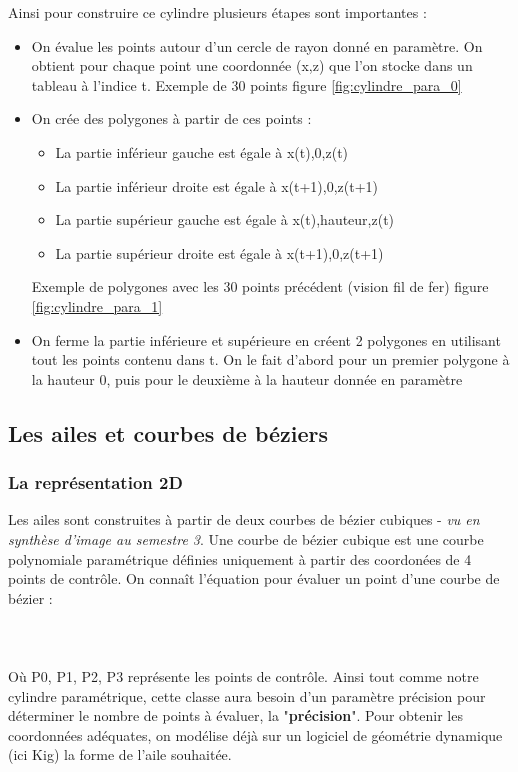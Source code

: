 \documentclass{article}
\begin{document}
Ainsi pour construire ce cylindre plusieurs étapes sont importantes :

\begin{itemize}
\item On évalue les points autour d'un cercle de rayon donné en paramètre. On obtient pour chaque point une coordonnée (x,z) que l'on stocke dans un tableau à l'indice t. Exemple de 30 points figure \ref{fig:cylindre_para_0}
\item On crée des polygones à partir de ces points :
	\begin{itemize}
		\item La partie inférieur gauche est égale à x(t),0,z(t)
		\item La partie inférieur droite est égale à x(t+1),0,z(t+1)
		\item La partie supérieur gauche est égale à x(t),hauteur,z(t)
		\item La partie supérieur droite est égale à x(t+1),0,z(t+1)
	\end{itemize}
Exemple de polygones avec les 30 points précédent (vision fil de fer) figure \ref{fig:cylindre_para_1}
\item On ferme la partie inférieure et supérieure en créent 2 polygones en utilisant tout les points contenu dans t. On le fait d'abord pour un premier polygone à la hauteur 0, puis pour le deuxième à la hauteur donnée en paramètre
\end{itemize}


\subsection{Les ailes et courbes de béziers}

\subsubsection{La représentation 2D}

Les ailes sont construites à partir de deux courbes de bézier cubiques - \textit{vu en synthèse d'image au semestre 3}. Une courbe de bézier cubique est une courbe polynomiale paramétrique définies uniquement à partir des coordonées de 4 points de contrôle. On connaît l'équation pour évaluer un point d'une courbe de bézier :\\~\\
\equabezier \\~\\
Où P0, P1, P2, P3 représente les points de contrôle. Ainsi tout comme notre cylindre paramétrique, cette classe aura besoin d'un paramètre précision pour déterminer le nombre de points à évaluer, la "\textbf{précision}".
Pour obtenir les coordonnées adéquates, on modélise déjà sur un logiciel de géométrie dynamique (ici Kig) la forme de l'aile souhaitée.\\
\end{document}
